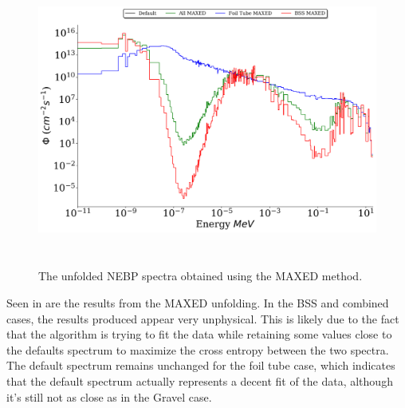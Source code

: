 \begin{figure}[htb]
\includegraphics[height=3.8in]{tex/figures/unfolded_mx.png}
\caption[MAXED Unfolded Spectra]{The unfolded NEBP spectra obtained using the MAXED method.}
\label{fig:unfolded_mx}
\end{figure}

Seen in  are the results from the MAXED unfolding.
In the BSS and combined cases, the results produced appear very unphysical.
This is likely due to the fact that the algorithm is trying to fit the data while retaining some values close to the defaults spectrum to maximize the cross entropy between the two spectra.
The default spectrum remains unchanged for the foil tube case, which indicates that the default spectrum actually represents a decent fit of the data, although it's still not as close as in the Gravel case.

